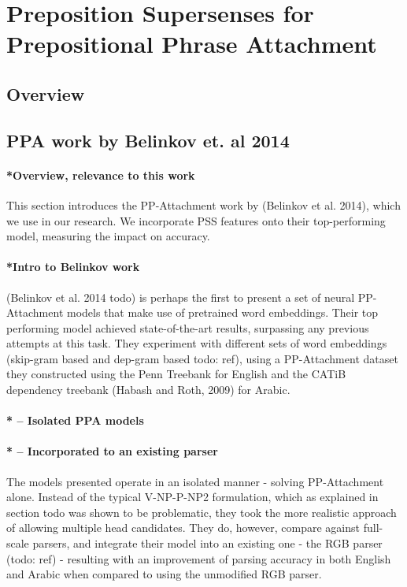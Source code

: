 
\chapter{Preposition Supersenses for  Prepositional Phrase Attachment} %

\label{Chapter3} %


\section{Overview}

\section{PPA work by Belinkov et. al 2014}
\subsubsection{*Overview, relevance to this work}
This section introduces the PP-Attachment work by (Belinkov et al. 2014), which we use in our research. We incorporate PSS features onto their top-performing model, measuring the impact on accuracy. 

\subsubsection{*Intro to Belinkov work}
(Belinkov et al. 2014 todo) is perhaps the first to present a set of neural PP-Attachment models that make use of pretrained word embeddings. Their top performing model achieved state-of-the-art results, surpassing any previous attempts at this task. They experiment with different sets of word embeddings (skip-gram based and dep-gram based todo: ref), using a PP-Attachment dataset they constructed using the Penn Treebank for English and the CATiB dependency treebank (Habash and Roth, 2009) for Arabic.    

\subsubsection{* -- Isolated PPA models}
\subsubsection{* -- Incorporated to an existing parser}
The models presented operate in an isolated manner - solving PP-Attachment alone. Instead of the typical V-NP-P-NP2 formulation, which as explained in section todo was shown to be problematic, they took the more realistic approach of allowing multiple head candidates. They do, however, compare against full-scale parsers, and integrate their model into an existing one - the RGB parser (todo: ref) - resulting with an improvement of parsing accuracy in both English and Arabic when compared to using the unmodified RGB parser.

